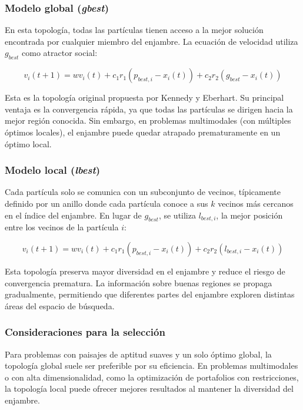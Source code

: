 \subsubsection{Modelo global (\textit{gbest})}

En esta topología, todas las partículas tienen acceso a la mejor
solución encontrada por cualquier miembro del enjambre. La ecuación
de velocidad utiliza $g_{best}$ como atractor social:

\begin{equation}
  v_i(t+1) = w v_i(t) + c_1 r_1 (p_{best,i} - x_i(t)) + c_2 r_2
  (g_{best} - x_i(t))
\end{equation}

Esta es la topología original propuesta por Kennedy y Eberhart.
Su principal ventaja es la convergencia rápida, ya que todas las
partículas se dirigen hacia la mejor región conocida. Sin embargo,
en problemas multimodales (con múltiples óptimos locales), el
enjambre puede quedar atrapado prematuramente en un óptimo local.

\subsubsection{Modelo local (\textit{lbest})}

Cada partícula solo se comunica con un subconjunto de vecinos,
típicamente definido por un anillo donde cada partícula conoce a sus
$k$ vecinos más cercanos en el índice del enjambre. En lugar de
$g_{best}$, se utiliza $l_{best,i}$, la mejor posición entre los
vecinos de la partícula $i$:

\begin{equation}
  v_i(t+1) = w v_i(t) + c_1 r_1 (p_{best,i} - x_i(t)) + c_2 r_2
  (l_{best,i} - x_i(t))
\end{equation}

Esta topología preserva mayor diversidad en el enjambre y reduce el
riesgo de convergencia prematura. La información sobre buenas
regiones se propaga gradualmente, permitiendo que diferentes partes
del enjambre exploren distintas áreas del espacio de búsqueda.

\subsubsection{Consideraciones para la selección}

Para problemas con paisajes de aptitud suaves y un solo óptimo
global, la topología global suele ser preferible por su eficiencia.
En problemas multimodales o con alta dimensionalidad, como la
optimización de portafolios con restricciones, la topología local
puede ofrecer mejores resultados al mantener la diversidad del
enjambre.

